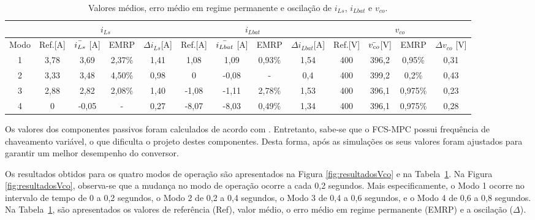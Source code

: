 \begin{table}[h]
\begin{center}
\caption{Valores médios, erro médio em regime permanente e oscilação de $i_{Ls}$, $i_{Lbat}$ e $v_{co}$.}
\begin{tabular}{ c *{4}{c} *{4}{c} *{4}{c} }
\hline
\multicolumn{1}{c|}{} & \multicolumn{4}{c|}{$i_{Ls}$} & \multicolumn{4}{c|}{$i_{Lbat}$} & \multicolumn{4}{c}{$v_{co}$} \\ 
\hline 
 Modo &  Ref.[A] & $\Bar{i_{Ls}}$ [A] & EMRP & $\Delta i_{Ls}$[A] & Ref.[A] & $\Bar{i_{Lbat}}$ [A] & EMRP & $\Delta i_{Lbat}$[A] & Ref.[V] & $\Bar{v_{co}}$[V] & EMRP & $\Delta v_{co}$ [V] \\ [0.5em]
\hline
1 & 3,78 & 3,69 & 2,37\% & 1,41 & 1,08 & 1,09 & 0,93\% & 1,54 & 400 & 396,2 & 0,95\% & 0,31 \\
2 & 3,33 & 3,48 & 4,50\% & 0,98 & 0 & -0,08 & - & 0,4 & 400 & 399,2 & 0,2\% & 0,43 \\
3 & 2,88 & 2,82 & 2,08\% & 1,40 & -1,08 & -1,11 & 2,78\% & 1,53 & 400 & 396,1 & 0,975\% & 0,23 \\
4 & 0 & -0,05 & - & 0,27 & -8,07 & -8,03 & 0,49\% & 1,34 & 400 & 396,1 & 0,975\% & 0,28 \\
\hline
\end{tabular}

\label{tab:resultadosCombinados}
\end{center}
\end{table}




\vspace{-10pt}

Os valores dos componentes passivos foram calculados de acordo com \cite{pacheco2002dc}. Entretanto, sabe-se que o FCS-MPC possui frequência de chaveamento variável, o que dificulta o projeto destes componentes. Desta forma, após as simulações os seus valores foram ajustados para garantir um melhor desempenho do conversor.

Os resultados obtidos para os quatro modos de operação são apresentados na Figura \ref{fig:resultadosVco} e na Tabela~\ref{tab:resultadosCombinados}. Na Figura \ref{fig:resultadosVco}, observa-se que a mudança no modo de operação ocorre a cada 0,2 segundos. Mais especificamente, o Modo 1 ocorre no intervalo de tempo de 0 a 0,2 segundos, o Modo 2 de 0,2 a 0,4 segundos, o Modo 3 de 0,4 a 0,6 segundos, e o Modo 4 de 0,6 a 0,8 segundos. Na Tabela~\ref{tab:resultadosCombinados}, são apresentados os valores de referência (Ref), valor médio, o erro médio em regime permanente (EMRP) e a oscilação ($\Delta$).


